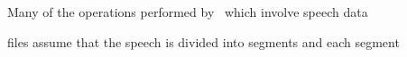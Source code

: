 



































%




%












Many of the operations performed by \HTK\ which involve speech data


files assume that the speech is divided into segments and each segment


